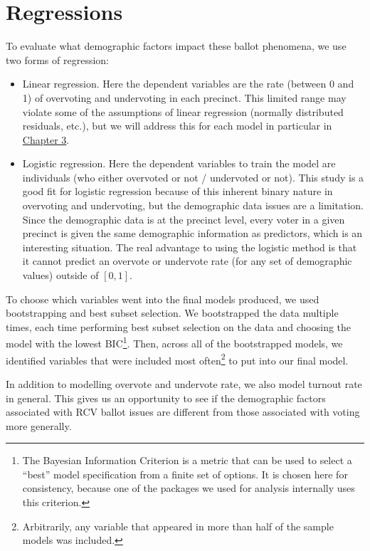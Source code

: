 \documentclass[12pt,twoside]{reedthesis}
\begin{document}
\hypertarget{regressions}{%
\section{Regressions}\label{regressions}}

To evaluate what demographic factors impact these ballot phenomena, we use two forms of regression:
\begin{itemize}
\item
  Linear regression. Here the dependent variables are the rate (between 0 and 1) of overvoting and undervoting in each precinct. This limited range may violate some of the assumptions of linear regression (normally distributed residuals, etc.), but we will address this for each model in particular in \protect\hyperlink{demo-results}{Chapter 3}.
\item
  Logistic regression. Here the dependent variables to train the model are individuals (who either overvoted or not / undervoted or not). This study is a good fit for logistic regression because of this inherent binary nature in overvoting and undervoting, but the demographic data issues are a limitation. Since the demographic data is at the precinct level, every voter in a given precinct is given the same demographic information as predictors, which is an interesting situation. The real advantage to using the logistic method is that it cannot predict an overvote or undervote rate (for any set of demographic values) outside of \([0,1]\).
\end{itemize}
To choose which variables went into the final models produced, we used bootstrapping and best subset selection. We bootstrapped the data multiple times, each time performing best subset selection on the data and choosing the model with the lowest BIC\footnote{The Bayesian Information Criterion is a metric that can be used to select a ``best'' model specification from a finite set of options. It is chosen here for consistency, because one of the packages we used for analysis internally uses this criterion.}. Then, across all of the bootstrapped models, we identified variables that were included most often\footnote{Arbitrarily, any variable that appeared in more than half of the sample models was included.} to put into our final model.

In addition to modelling overvote and undervote rate, we also model turnout rate in general. This gives us an opportunity to see if the demographic factors associated with RCV ballot issues are different from those associated with voting more generally.
\end{document}
